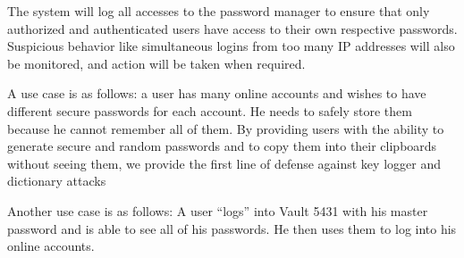 \documentclass{article}
\begin{document}
\par The system will log all accesses to the password manager to ensure that only authorized and authenticated users have access to their own respective passwords. Suspicious behavior like simultaneous logins from too many IP addresses will also be monitored, and action will be taken when required.

\par A use case is as follows: a user has many online accounts and wishes to have different secure passwords for each account. He needs to safely store them because he cannot remember all of them. By providing users with the ability to generate secure and random passwords and to copy them into their clipboards without seeing them, we provide the first line of defense against key logger and dictionary attacks

\par Another use case is as follows: A user “logs” into Vault 5431 with his master password and is able to see all of his passwords. He then uses them to log into his online accounts.
\end{document}
